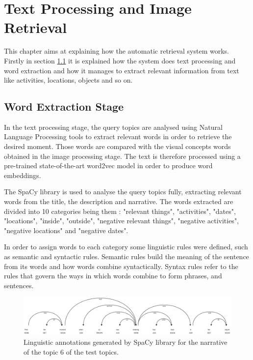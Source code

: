 \chapter{Text Processing and Image Retrieval}

This chapter aims at explaining how the automatic retrieval system works. Firstly in section \ref{sec:text} it is explained how the system does text processing and word extraction and how it manages to extract relevant information from text like activities, locations, objects and so on.



\section{ Word Extraction Stage}
\label{sec:text}

In the text processing stage, the query topics are analysed using Natural Language Processing tools to extract relevant words in order to retrieve the desired moment. Those words are compared with the visual concepts words obtained in the image processing stage. The text is therefore processed using a pre-trained state-of-the-art word2vec model in order to produce word embeddings.

The SpaCy library is used to analyse the query topics fully, extracting relevant words from the title, the description and narrative. The words extracted are divided into 10 categories being them : "relevant things", "activities", "dates", "locations", "inside", "outside", "negative relevant things", "negative activities", "negative locations" and "negative dates".

In order to assign words to each category some linguistic rules were defined,
such as semantic and syntactic rules. Semantic rules build the meaning of the
sentence from its words and how words combine syntactically. Syntax rules refer to
the rules that govern the ways in which words combine to form phrases, and
sentences. 

\begin{figure}[H]
    \centering
    \captionsetup{justification=centering}
    \includegraphics[width = 0.9 \textwidth]{Sections/6textprocessing/images/spacy.png}
    \caption{Linguistic annotations generated by SpaCy library for the narrative of the topic 6 of the test topics.}
    \label{fig:spacy_labels}
  \end{figure}
  
